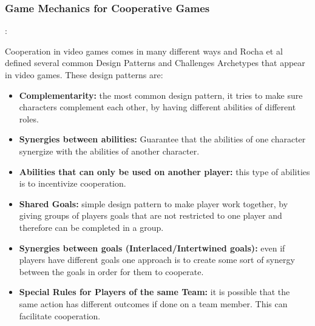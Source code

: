 \documentclass[runningheads]{llncs}
\begin{document}
\subsubsection{Game Mechanics for Cooperative Games}:

Cooperation in video games comes in many different ways and Rocha et al~\cite{ref_rocha} defined several common Design Patterns and Challenges Archetypes that appear in video games. These design patterns are:

\begin{itemize}
    \item\textbf{Complementarity:} the most common design pattern, it tries to make sure characters complement each other, by having different abilities of different roles.
    \item\textbf{Synergies between abilities:} Guarantee that the abilities of one  character synergize with the abilities of another character.
    \item\textbf{Abilities that can only be used on another player:} this type of abilities is to incentivize cooperation.
    \item\textbf{Shared Goals:} simple design pattern to make player work together, by giving groups of players goals that are not restricted to one player and therefore can be completed in a group.
    \item\textbf{Synergies between goals (Interlaced/Intertwined goals):} even if players have different goals one approach is to create some sort of synergy between the goals in order for them to cooperate.
    \item\textbf{Special Rules for Players of the same Team:} it is possible that the same action has different outcomes if done on a team member. This can facilitate cooperation.
\end{itemize}
\end{document}
